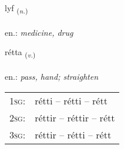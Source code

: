\documentclass[frontgrid, backgrid]{flacards}\usepackage[]{graphicx}\usepackage[]{xcolor}
\begin{document}
\renewcommand{\flhead}{\vskip5pt \fboxsep=0pt {\small\bfseries\footnotesize Nafnorð | Noun}}
\renewcommand{\fcfoot}{\vskip5pt \fboxsep=0pt \hspace{2pt}{\small\bfseries\footnotesize 2K}}

\renewcommand{\blhead}{\vskip5pt {\small\bfseries\footnotesize Nafnorð | Noun }}
\renewcommand{\bcfoot}{\vskip5pt \hspace{2pt}{\small\bfseries\footnotesize 2K}}


{lyf \small{\textsubscript{(\textit{n.})}} \\[1ex] %
\textphonetic{[lɪːv]} \\
en.: \emph{medicine, drug} \\  [2ex]
\renewcommand*{\arraystretch}{0.8}
}

\renewcommand{\flhead}{\vskip5pt \fboxsep=0pt {\small\bfseries\footnotesize Sagnorð | Verb}}
\renewcommand{\fcfoot}{\vskip5pt \fboxsep=0pt \hspace{2pt}{\small\bfseries\footnotesize 2K}}

\renewcommand{\blhead}{\vskip5pt {\small\bfseries\footnotesize Sagnorð | Verb }}
\renewcommand{\bcfoot}{\vskip5pt \hspace{2pt}{\small\bfseries\footnotesize 2K}}


{rétta \small{\textsubscript{(\textit{v.})}} \\[1ex] %
\textphonetic{[rjɛhta]} \\
en.: \emph{pass, hand; straighten} \\  [2ex]
\renewcommand*{\arraystretch}{0.8}
\begin{tabular}{p{1cm}l}
\textsc{1sg}: & rétti -- rétti -- rétt \\ 
\textsc{2sg}: & réttir -- réttir -- rétt \\ 
\textsc{3sg}: & réttir -- rétti -- rétt \\ 
\end{tabular}
}
\end{document}
